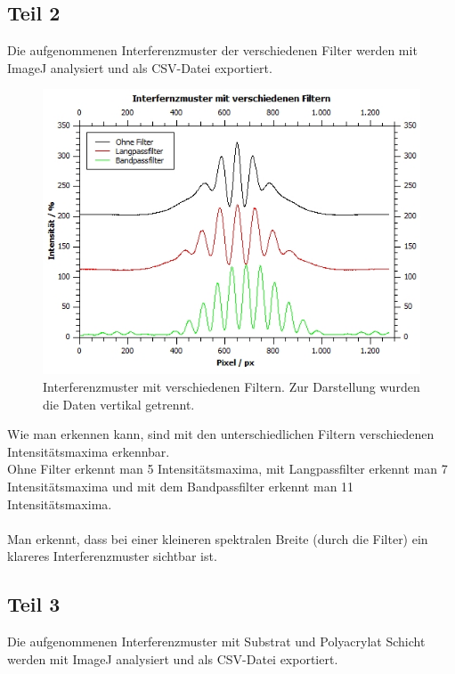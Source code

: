 \documentclass[12pt,a4paper,twoside]{article}
\begin{document}
\subsection{Teil 2}
Die aufgenommenen Interferenzmuster der verschiedenen Filter werden mit ImageJ analysiert und als CSV-Datei exportiert. 

\begin{figure}[H]
    \centering
    \includegraphics[width=0.7\linewidth]{nudes/aufgabe 2 plot.jpg}
    \caption{Interferenzmuster mit verschiedenen Filtern. Zur Darstellung wurden die Daten vertikal getrennt.}
    \label{fig:aufgabe 2 kontrast}
\end{figure}

\noindent
Wie man erkennen kann, sind mit den unterschiedlichen Filtern verschiedenen Intensitätsmaxima erkennbar. 
\\
Ohne Filter erkennt man 5 Intensitätsmaxima, mit Langpassfilter erkennt man 7 Intensitätsmaxima und mit dem Bandpassfilter erkennt man 11 Intensitätsmaxima. 
\\
\\
Man erkennt, dass bei einer kleineren spektralen Breite (durch die Filter) ein klareres Interferenzmuster sichtbar ist. 

\subsection{Teil 3}
Die aufgenommenen Interferenzmuster mit Substrat und Polyacrylat Schicht werden mit ImageJ analysiert und als CSV-Datei exportiert. 
\end{document}
